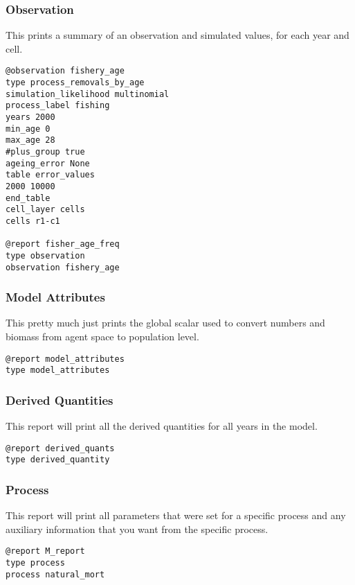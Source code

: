 \subsubsection{Observation}
This prints a summary of an observation and simulated values, for each year and cell.

{\small{\begin{verbatim}
@observation fishery_age
type process_removals_by_age
simulation_likelihood multinomial
process_label fishing
years 2000
min_age 0
max_age 28
#plus_group true
ageing_error None
table error_values
2000 10000
end_table
cell_layer cells
cells r1-c1	
		
@report fisher_age_freq
type observation
observation fishery_age
\end{verbatim}}}


\subsubsection{Model Attributes}
This pretty much just prints the global scalar used to convert numbers and biomass from agent space to population level.
{\small{\begin{verbatim}
@report model_attributes
type model_attributes
\end{verbatim}}}


\subsubsection{Derived Quantities}
This report will print all the derived quantities for all years in the model.
{\small{\begin{verbatim}
@report derived_quants
type derived_quantity
\end{verbatim}}}

\subsubsection{Process}
This report will print all parameters that were set for a specific process and any auxiliary information that you want from the specific process.
{\small{\begin{verbatim}
@report M_report
type process
process natural_mort
\end{verbatim}}}